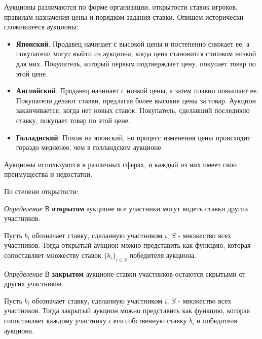 Аукционы различаются по форме организации, открытости ставок игроков, правилам назначения цены и порядком задания ставки.
Опишем исторически сложившееся аукционы: 
\begin{itemize}
    \item \textbf{Японский}. Продавец начинает с высокой цены и постепенно снижает ее, а покупатели могут выйти из аукциона, когда цена становится слишком низкой для них. Покупатель, который первым подтверждает цену, покупает товар по этой цене.
    \item \textbf{Английский}. Продавец начинает с низкой цены, а затем плавно повышает ее. Покупатели делают ставки, предлагая более высокие цены за товар. Аукцион заканчивается, когда нет новых ставок. Покупатель, сделавший последнюю ставку, покупает товар по этой цене.
    \item \textbf{Голладнский}. Похож на японский, но процесс изменения цены происходит гораздо медленее, чем в голландском аукционе.
\end{itemize}

Аукционы используются в различных сферах, и каждый из них имеет свои преимущества и недостатки. 

По степени открытости:

\textit{Определение} В \textbf{открытом} аукционе все участники могут видеть ставки других участников.

Пусть \( b_i \) обозначает ставку, сделанную участником \( i \), \( S \) - множество всех участников. Тогда открытый аукцион можно представить как функцию, которая сопоставляет множеству ставок \( \{b_i\}_{i \in S} \) победителя аукциона.

\textit{Определение} В \textbf{закрытом} аукционе ставки участников остаются скрытыми от других участников.
 
 Пусть \( b_i \) обозначает ставку, сделанную участником \( i \), \( S \) - множество всех участников. Тогда закрытый аукцион можно представить как функцию, которая сопоставляет каждому участнику \( i \) его собственную ставку \( b_i \) и победителя аукциона.
